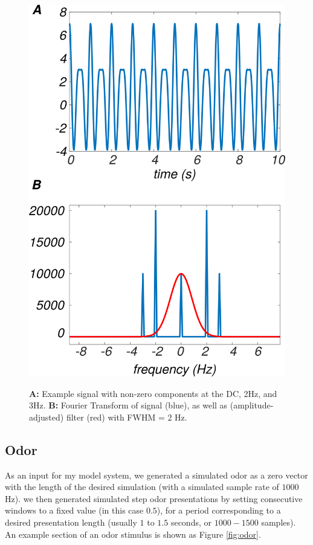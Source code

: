 \documentclass[a4paper,12pt,twoside]{article}
\begin{document}
\begin{figure}
\centering

\caption{\textbf{A:} Example signal with non-zero components at the DC, 2Hz, and 3Hz.  \textbf{B:} Fourier Transform of signal (blue), as well as (amplitude-adjusted) filter (red) with FWHM = 2 Hz.\newline}
\hspace*{-3.25cm}
\includegraphics[scale=0.7]{2016-06-16FilterExample.png}
\label{fig:filt}
\end{figure}

\subsection{Odor}
As an input for my model system, we generated a simulated odor as a zero vector with the length of the desired simulation (with a simulated sample rate of $1000$ Hz).  we then generated simulated step odor presentations by setting consecutive windows to a fixed value (in this case $0.5$), for a period corresponding to a desired presentation length (usually $1$ to $1.5$ seconds, or $1000-1500$ samples).  An example section of an odor stimulus is shown as Figure \ref{fig:odor}.
\end{document}
